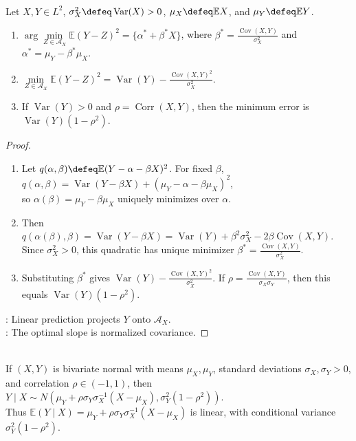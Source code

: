 \begin{theorem} \label{thm:best-linear-predictor} \\
Let $X,Y\in L^2$, $\sigma_X^2\defeq\operatorname{Var}(X)>0$, $\mu_X\defeq\mathbb{E}X$, and $\mu_Y\defeq\mathbb{E}Y$.
\begin{enumerate}[label=(\roman*)]
\setlength{\itemsep}{0pt}
\item $\arg\min\limits_{Z\in\mathcal{A}_X}\mathbb{E}(Y-Z)^2=\{\alpha^*+\beta^*X\}$, where $\beta^*=\frac{\operatorname{Cov}(X,Y)}{\sigma_X^2}$ and $\alpha^*=\mu_Y-\beta^*\mu_X$.
\item $\min\limits_{Z\in\mathcal{A}_X}\mathbb{E}(Y-Z)^2=\operatorname{Var}(Y)-\frac{\operatorname{Cov}(X,Y)^2}{\sigma_X^2}$.
\item If $\operatorname{Var}(Y)>0$ and $\rho=\operatorname{Corr}(X,Y)$, then the minimum error is $\operatorname{Var}(Y)(1-\rho^2)$.
\end{enumerate}
\begin{proof}
\begin{enumerate}[label=(\roman*)]
\setlength{\itemsep}{0pt}
\item Let $q(\alpha,\beta)\defeq\mathbb{E}(Y-\alpha-\beta X)^2$. For fixed $\beta$, $q(\alpha,\beta)=\operatorname{Var}(Y-\beta X)+(\mu_Y-\alpha-\beta\mu_X)^2$,\\
so $\alpha(\beta)=\mu_Y-\beta\mu_X$ uniquely minimizes over $\alpha$.
\item Then $q(\alpha(\beta),\beta)=\operatorname{Var}(Y-\beta X)=\operatorname{Var}(Y)+\beta^2\sigma_X^2-2\beta\operatorname{Cov}(X,Y)$.\\
Since $\sigma_X^2>0$, this quadratic has unique minimizer $\beta^*=\frac{\operatorname{Cov}(X,Y)}{\sigma_X^2}$.
\item Substituting $\beta^*$ gives $\operatorname{Var}(Y)-\frac{\operatorname{Cov}(X,Y)^2}{\sigma_X^2}$. If $\rho=\frac{\operatorname{Cov}(X,Y)}{\sigma_X\sigma_Y}$, then this equals $\operatorname{Var}(Y)(1-\rho^2)$.
\end{enumerate}
: Linear prediction projects $Y$ onto $\mathcal{A}_X$.\\
: The optimal slope is normalized covariance.
\end{proof}
\end{theorem}

\begin{example} \label{ex:bivariate-normal-prediction} \\
If $(X,Y)$ is bivariate normal with means $\mu_X,\mu_Y$, standard deviations $\sigma_X,\sigma_Y>0$, and correlation $\rho\in(-1,1)$, then $Y\mid X\sim N(\mu_Y+\rho\sigma_Y\sigma_X^{-1}(X-\mu_X),\sigma_Y^2(1-\rho^2))$.\\
Thus $\mathbb{E}(Y\mid X)=\mu_Y+\rho\sigma_Y\sigma_X^{-1}(X-\mu_X)$ is linear, with conditional variance $\sigma_Y^2(1-\rho^2)$.
\end{example}


